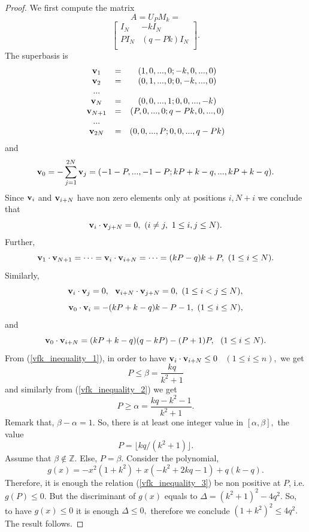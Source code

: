 \documentclass{amsart}
\numberwithin{equation}{section}
\begin{document}
\begin{proof}
We first compute the matrix
$$A = U_PM_k=$$
\begin{equation}\label{vfk-matrix}
 \left[\begin{array}{c|c}
I_N & -kI_N  \\
\hline
PI_N & (q-Pk)I_N   \\
\end{array}\right].
\end{equation}
The superbasis is 
$$	
\begin{array}{ccc}
{\bf v}_1 & = &(1,0,...,0;-k,0,...,0)\\
{\bf v}_2 & =  & (0,1,...,0; 0,-k,...,0)\\
... \\
{\bf v}_N & = &(0,0,...,1;0,0,...,-k) \\
{\bf v}_{N+1} & = &(P,0,...,0;q-Pk,0,...,0) \\
...\\
{\bf v}_{2N} & = & (0,0,...,P;0,0,...,q-Pk)\\
\end{array}
$$ 
and
$${\bf v}_0 = -\sum_{j=1}^{2N} {\bf v}_j=(-1-P,...,-1-P;kP+k-q,...,kP+k-q).$$
Since ${\bf v}_i$ and ${\bf v}_{i+N}$ have non zero elements only at positions $i, N+i$ we conclude that
$${\bf v}_i\cdot {\bf v}_{j+N}=0,\ (i\not=j,\ 1\leq i,j\leq N).$$
Further,
\begin{equation}\label{vfk_inequality_1}
{\bf v}_1\cdot {\bf v}_{N+1} = \cdots={\bf v}_i\cdot {\bf v}_{i+N}=\cdots=(kP - q)k + P, \ (1\leq i \leq N).
\end{equation}			 
Similarly, 
$${\bf v}_i\cdot {\bf v}_j=0, \ \ {\bf v}_{i+N}\cdot {\bf v}_{j+N}=0,\ (1\leq i<j\leq N),$$
\begin{equation}\label{vfk_inequality_2}
{\bf v}_0\cdot {\bf v}_i =  -(kP + k - q)k - P - 1,\ (1\leq i\leq N),
\end{equation}			 
and
\begin{equation}\label{vfk_inequality_3}
{\bf v}_0\cdot {\bf v}_{i+N} =  (kP + k - q)(q-kP) - (P + 1)P,\ \ (1\leq i\leq N).
\end{equation}		
From (\ref{vfk_inequality_1}), in order to have ${\bf v}_i\cdot {\bf v}_{i+N}\leq 0$ \ $(1\le i\le n),$  we get 
$$P\le \beta=\frac{kq}{k^2+1}$$
and similarly from (\ref{vfk_inequality_2}) we get $$P\ge \alpha=\frac{kq-k^2-1}{k^2+1}.$$
Remark that,	
 $\beta - \alpha = 1.$ So, there is at least one   integer value in 
$[\alpha,\beta],$ the value 
\begin{equation}\label{value_of_P}
P=\lfloor kq/(k^2+1)\rfloor.
\end{equation}
Assume that $\beta\not\in {\mathbb{Z}}.$
Else, $P=\beta.$ 
Consider the polynomial, 
$$g(x) = -x^2(1+k^2)+x(-k^2+2kq-1)+q(k-q).$$
Therefore, it is enough the relation (\ref{vfk_inequality_3}) be non positive at $P$, i.e. $g(P)\leq 0.$
But the discriminant of $g(x)$ equals to $\Delta = (k^2+1)^2-4q^2.$ So, to have $g(x)\leq 0$ it is enough $\Delta\leq 0,$ therefore we conclude $(1+k^2)^2\le 4q^2.$ The result follows.
\end{proof}
\end{document}
